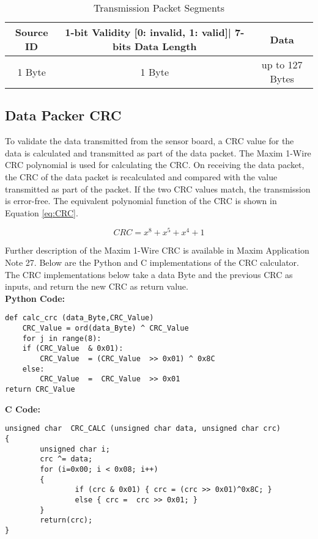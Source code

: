 \begin{table}[H]
    \centering
    {
    \begin{tabular}{|c|c|c|}
        \hline
        \rowcolor{black!8}
        \textbf{Source ID} & \bf{1-bit Validity [0: invalid, 1: valid]| 7-bits Data Length} & \textbf{Data} \\ \hline
        1 Byte & 1 Byte & up to 127 Bytes \\
        \hline
    \end{tabular}
    }
    \caption{Transmission Packet Segments}
    \label{table:packsegments}
\end{table}




\subsection{Data Packer CRC} \label{ssec:crc-calc}

To validate the data transmitted from the sensor board, a CRC value for the data is
calculated and transmitted as part of the data packet. The Maxim 1-Wire
CRC polynomial is used for calculating the CRC.  On receiving the data packet, the CRC
of the data packet is recalculated and compared with the value transmitted as part of
the packet. If the two CRC values match, the transmission is error-free.
The equivalent polynomial function of the CRC is shown in Equation \ref{eq:CRC}.

\begin{equation}
\label{eq:CRC}
CRC = x^8 + x^5 + x^4 + 1
\end{equation}

Further description of the Maxim 1-Wire CRC is available in Maxim Application Note 27. Below are
the Python and C implementations of the CRC calculator. The CRC implementations below take a
data Byte and the previous CRC as inputs, and return the new CRC as return value.
\\

\textbf{Python Code:}
\begin{mdframed}
\begin{lstlisting}
def calc_crc (data_Byte,CRC_Value)
    CRC_Value = ord(data_Byte) ^ CRC_Value
    for j in range(8):
    if (CRC_Value  & 0x01):
        CRC_Value  = (CRC_Value  >> 0x01) ^ 0x8C
    else:
        CRC_Value  =  CRC_Value  >> 0x01
return CRC_Value
\end{lstlisting}
\end{mdframed}

\vskip 0.1in
\textbf{C Code:}
\begin{mdframed}
\begin{lstlisting}
unsigned char  CRC_CALC (unsigned char data, unsigned char crc) 
{ 
        unsigned char i;
        crc ^= data;
        for (i=0x00; i < 0x08; i++)
        {
                if (crc & 0x01) { crc = (crc >> 0x01)^0x8C; }
                else { crc =  crc >> 0x01; }
        }
        return(crc);
}
\end{lstlisting}
\end{mdframed}